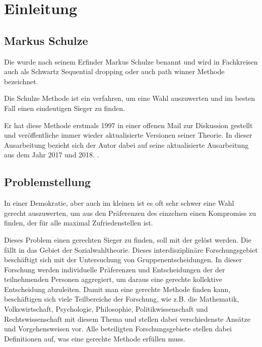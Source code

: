 \section{Einleitung}
\label{sec:Einleitung}


\subsection{Markus Schulze} 
\label{sec:markusSchulze}
Die \schulze wurde nach seinem Erfinder Markus Schulze benannt und wird in Fachkreisen auch als \glqq Schwartz Sequential dropping\grqq{} oder auch \glqq path winner\grqq{} Methode bezeichnet.

Die Schulze Methode ist ein verfahren, um eine Wahl auszuwerten und im besten Fall einen eindeutigen Sieger zu finden.

Er hat diese Methode erstmals 1997 in einer offenen Mail zur Diskussion gestellt \citep{Schulze1997} und veröffentliche immer wieder aktualisierte Versionen seiner Theorie. In dieser Ausarbeitung bezieht sich der Autor dabei auf seine aktualisierte Ausarbeitung aus dem Jahr 2017 und 2018.\citep{Schulze2017, Schulze2018} .

\subsection{Problemstellung} 
\label{sec:problemstellung}
In einer Demokratie, aber auch im kleinen ist es oft sehr schwer eine Wahl gerecht auszuwerten, um aus den Präferenzen des einzelnen einen Kompromiss zu finden, der für alle maximal Zufriedenstellen ist.

Dieses Problem einen gerechten Sieger zu finden, soll mit der \schulze gelöst werden. Die \schulze fällt in das Gebiet der Sozialwahltheorie. Dieses interdisziplinäre Forschungsgebiet beschäftigt sich mit der Untersuchung von Gruppenentscheidungen. In dieser Forschung werden individuelle Präferenzen und Entscheidungen der der teilnehmenden Personen aggregiert, um daraus eine \glqq gerechte\grqq{} kollektive Entscheidung abzuleiten. Damit man eine \glqq gerechte\grqq{} Methode finden kann, beschäftigen sich viele Teilbereiche der Forschung, wie z.B. die Mathematik, Volkswirtschaft, Psychologie, Philosophie, Politikwissenschaft und Rechtswissenschaft mit diesem Thema und stellen dabei verschiedenste Ansätze und Vorgehensweisen vor. Alle beteiligten Forschungsgebiete stellen dabei Definitionen auf, was eine \glqq gerechte\grqq{} Methode erfüllen muss. \citep{scheubrein2013computerunterstuetzte}

